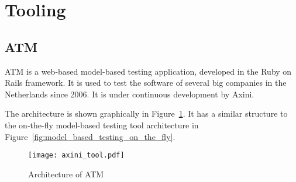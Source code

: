 \section{Tooling}\label{sec:tooling}

\subsection{ATM}\label{sec:descriptionaxini}
ATM is a web-based model-based testing application, developed in the Ruby on Rails framework. It is used to test the software of several big companies in the Netherlands since 2006. It is under continuous development by Axini.

The architecture is shown graphically in Figure~\ref{fig:axini_tool}. It has a similar structure to the on-the-fly model-based testing tool architecture in Figure~\ref{fig:model_based_testing_on_the_fly}.

\begin{figure}[h!]
  \begin{center}
    \texttt{[image: axini\_tool.pdf]}
  \end{center}
  \caption{Architecture of ATM}
  \label{fig:axini_tool}
\end{figure}

